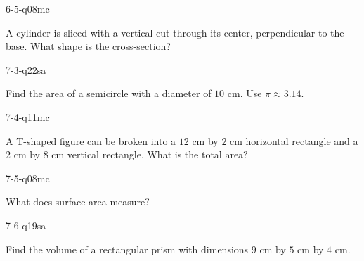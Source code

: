 \begin{practiceQuestion}{6-5-q08}{mc}
\begin{questionText}
A cylinder is sliced with a vertical cut through its center, perpendicular to the base. What shape is the cross-section?
\end{questionText}
\end{practiceQuestion}

\begin{practiceQuestion}{7-3-q22}{sa}
\begin{questionText}
Find the area of a semicircle with a diameter of $10$ cm. Use $\pi \approx 3.14$.
\end{questionText}
\end{practiceQuestion}

\begin{practiceQuestion}{7-4-q11}{mc}
\begin{questionText}
A T-shaped figure can be broken into a $12$ cm by $2$ cm horizontal rectangle and a $2$ cm by $8$ cm vertical rectangle. What is the total area?
\end{questionText}
\end{practiceQuestion}

\begin{practiceQuestion}{7-5-q08}{mc}
\begin{questionText}
What does surface area measure?
\end{questionText}
\end{practiceQuestion}

\begin{practiceQuestion}{7-6-q19}{sa}
\begin{questionText}
Find the volume of a rectangular prism with dimensions $9$ cm by $5$ cm by $4$ cm.
\end{questionText}
\end{practiceQuestion}


